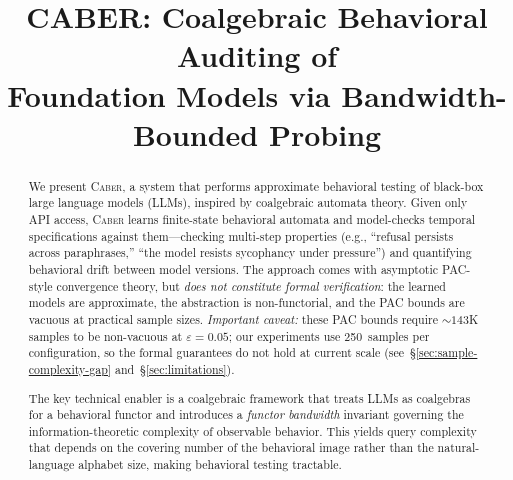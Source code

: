 \documentclass[11pt]{article}
\title{\textbf{CABER: Coalgebraic Behavioral Auditing of\\Foundation Models via Bandwidth-Bounded Probing}}
\author{}
\date{}
\newcommand{\tool}{\textsc{Caber}}
\begin{document}
\maketitle

\begin{abstract}
We present \tool{}, a system that performs approximate behavioral
testing of black-box large language models (LLMs), inspired by
coalgebraic automata theory.  Given only API access, \tool{} learns
finite-state behavioral automata and model-checks temporal
specifications against them---checking multi-step properties
(e.g., ``refusal persists across paraphrases,'' ``the model resists
sycophancy under pressure'') and quantifying behavioral drift between
model versions.  The approach comes with asymptotic PAC-style
convergence theory, but \emph{does not constitute formal verification}:
the learned models are approximate, the abstraction is non-functorial,
and the PAC bounds are vacuous at practical sample sizes.
\emph{Important caveat:} these PAC bounds require ${\sim}143$K samples
to be non-vacuous at $\varepsilon{=}0.05$; our experiments use 250~samples
per configuration, so the formal guarantees do not hold at current scale
(see~\S\ref{sec:sample-complexity-gap} and~\S\ref{sec:limitations}).

The key technical enabler is a coalgebraic framework that treats LLMs
as coalgebras for a behavioral functor and introduces a \emph{functor
bandwidth} invariant governing the information-theoretic complexity of
observable behavior.  This yields query complexity that depends on the
covering number of the behavioral image rather than the
natural-language alphabet size, making behavioral testing tractable.


\end{abstract}
\end{document}
